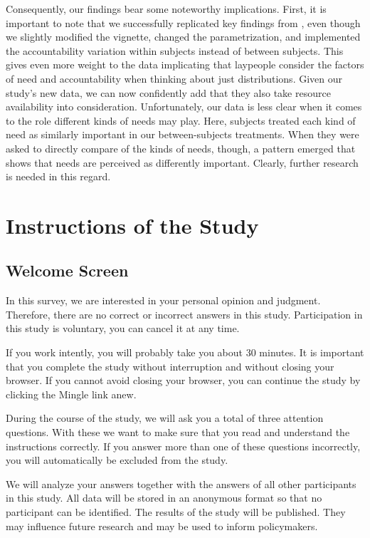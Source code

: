 \documentclass[egregdoesnotlikesansseriftitles]{scrartcl}
\begin{document}
Consequently, our findings bear some noteworthy implications.
First, it is important to note that we successfully replicated key findings from \citealt{bauer_need_2020}, even though we slightly modified the vignette, changed the parametrization, and implemented the accountability variation within subjects instead of between subjects.
This gives even more weight to the data implicating that laypeople consider the factors of need and accountability when thinking about just distributions.
Given our study's new data, we can now confidently add that they also take resource availability into consideration.
Unfortunately, our data is less clear when it comes to the role different kinds of needs may play.
Here, subjects treated each kind of need as similarly important in our between-subjects treatments.
When they were asked to directly compare of the kinds of needs, though, a pattern emerged that shows that needs are perceived as differently important.
Clearly, further research is needed in this regard.


\clearpage




\clearpage
\appendix
\section{Instructions of the Study}\label{sec:app_instructions}
\subsection*{Welcome Screen}
In this survey, we are interested in your personal opinion and judgment.
Therefore, there are no correct or incorrect answers in this study.
Participation in this study is voluntary, you can cancel it at any time.

If you work intently, you will probably take you about 30 minutes.
It is important that you complete the study without interruption and without closing your browser.
If you cannot avoid closing your browser, you can continue the study by clicking the Mingle link anew.

During the course of the study, we will ask you a total of three attention questions.
With these we want to make sure that you read and understand the instructions correctly.
If you answer more than one of these questions incorrectly, you will automatically be excluded from the study.

We will analyze your answers together with the answers of all other participants in this study.
All data will be stored in an anonymous format so that no participant can be identified.
The results of the study will be published.
They may influence future research and may be used to inform policymakers.
\end{document}
